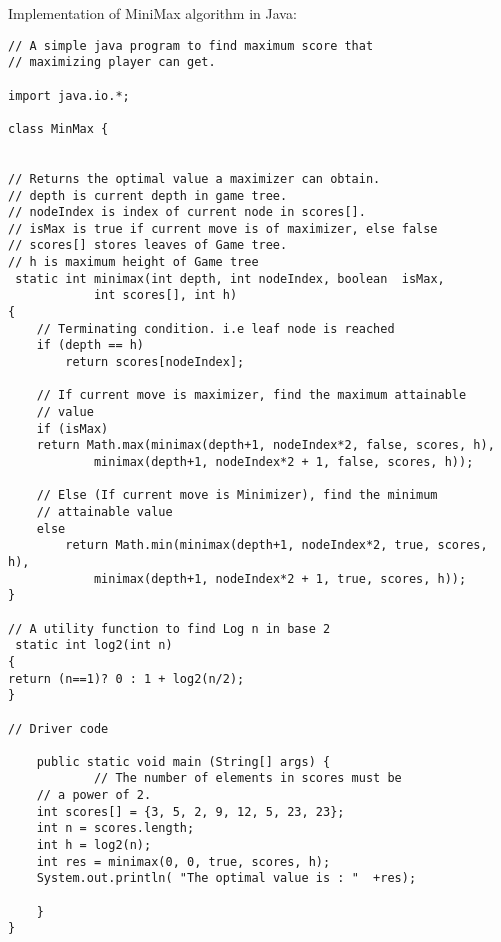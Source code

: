Implementation of MiniMax algorithm in Java: 

\begin{lstlisting}
// A simple java program to find maximum score that 
// maximizing player can get. 
  
import java.io.*; 
  
class MinMax { 
    
  
// Returns the optimal value a maximizer can obtain. 
// depth is current depth in game tree. 
// nodeIndex is index of current node in scores[]. 
// isMax is true if current move is of maximizer, else false 
// scores[] stores leaves of Game tree. 
// h is maximum height of Game tree 
 static int minimax(int depth, int nodeIndex, boolean  isMax, 
            int scores[], int h) 
{ 
    // Terminating condition. i.e leaf node is reached 
    if (depth == h) 
        return scores[nodeIndex]; 
  
    // If current move is maximizer, find the maximum attainable 
    // value 
    if (isMax) 
    return Math.max(minimax(depth+1, nodeIndex*2, false, scores, h), 
            minimax(depth+1, nodeIndex*2 + 1, false, scores, h)); 
  
    // Else (If current move is Minimizer), find the minimum 
    // attainable value 
    else
        return Math.min(minimax(depth+1, nodeIndex*2, true, scores, h), 
            minimax(depth+1, nodeIndex*2 + 1, true, scores, h)); 
} 
  
// A utility function to find Log n in base 2 
 static int log2(int n) 
{ 
return (n==1)? 0 : 1 + log2(n/2); 
} 
  
// Driver code 
  
    public static void main (String[] args) { 
            // The number of elements in scores must be 
    // a power of 2. 
    int scores[] = {3, 5, 2, 9, 12, 5, 23, 23}; 
    int n = scores.length; 
    int h = log2(n); 
    int res = minimax(0, 0, true, scores, h); 
    System.out.println( "The optimal value is : "  +res);  
          
    } 
} 
\end{lstlisting}